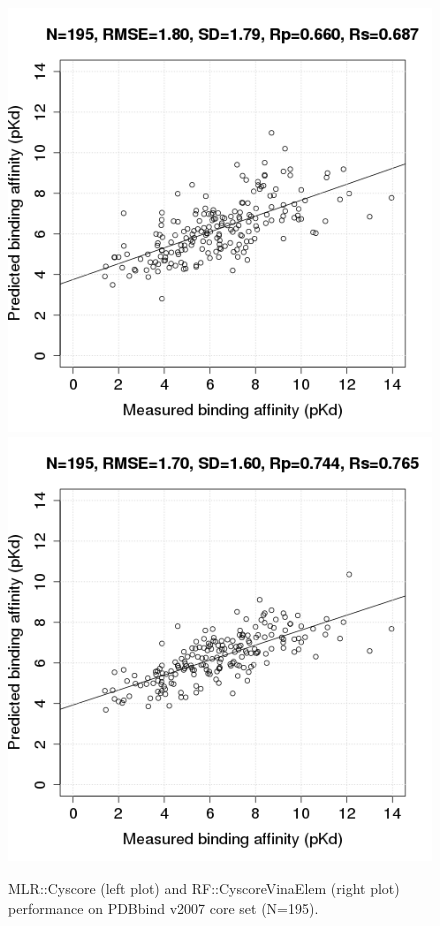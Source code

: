 \documentclass[journal=jacsat,manuscript=article]{achemso}
\begin{document}
\begin{figure}
\includegraphics[width=1.4\linewidth,natwidth=480,natheight=480]{../rfcyscore/x4/mlr/trn-247-tst-195-yp.png}
\endminipage\hfill
{}
\includegraphics[width=1.4\linewidth,natwidth=480,natheight=480]{../rfcyscore/x46/rf/trn-2280-tst-195-yp.png}
\endminipage\hfill
\caption{MLR::Cyscore (left plot) and RF::CyscoreVinaElem (right plot) performance on PDBbind v2007 core set (N=195).}
\label{fig:tst195}
\end{figure}
\end{document}
